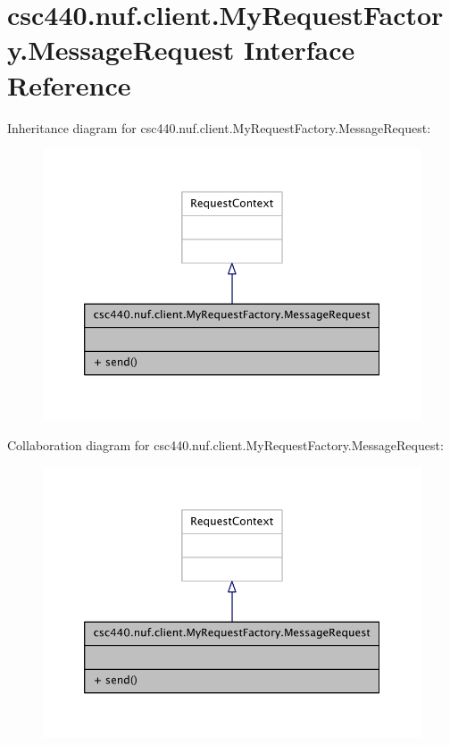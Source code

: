 \hypertarget{interfacecsc440_1_1nuf_1_1client_1_1_my_request_factory_1_1_message_request}{\section{csc440.\-nuf.\-client.\-My\-Request\-Factory.\-Message\-Request Interface Reference}
\label{interfacecsc440_1_1nuf_1_1client_1_1_my_request_factory_1_1_message_request}
}


Inheritance diagram for csc440.\-nuf.\-client.\-My\-Request\-Factory.\-Message\-Request\-:
\nopagebreak
\begin{figure}[H]
\begin{center}
\leavevmode
\includegraphics[width=350pt]{interfacecsc440_1_1nuf_1_1client_1_1_my_request_factory_1_1_message_request__inherit__graph}
\end{center}
\end{figure}


Collaboration diagram for csc440.\-nuf.\-client.\-My\-Request\-Factory.\-Message\-Request\-:
\nopagebreak
\begin{figure}[H]
\begin{center}
\leavevmode
\includegraphics[width=350pt]{interfacecsc440_1_1nuf_1_1client_1_1_my_request_factory_1_1_message_request__coll__graph}
\end{center}
\end{figure}
